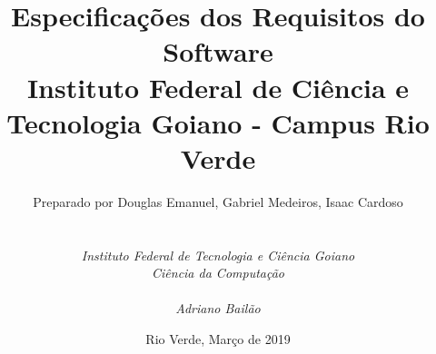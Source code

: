 
\def\Company{Consuloria}
\def\Institute{\textit{Instituto Federal de Tecnologia e Ciência Goiano}}
\def\Course{\textit{Ciência da Computação}}
\def\Docent{\textit{Adriano Bailão}}
\def\BoldTitle{Especificações dos Requisitos do Software}

\def\Subtitle{Instituto Federal de Ciência e Tecnologia Goiano - Campus Rio Verde \\}
\def\Authors{Preparado por Douglas Emanuel, Gabriel Medeiros, Isaac Cardoso} 
\def\Shortname{E. Douglas, M. Gabriel}


\title{\textbf{\BoldTitle}\\\Subtitle}
\author{\Authors \\ \\ \\ \Institute\\ \Course\\ \Module\\ \Docent\\ \Assistant}
\date{Rio Verde, Março de 2019}

